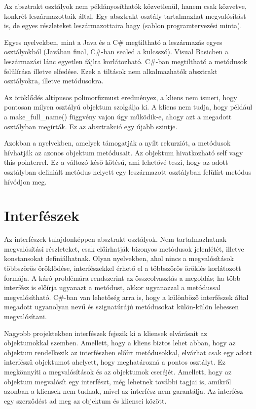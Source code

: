 \documentclass[a4paper,12pt,twoside]{report}
\theoremstyle{definition}
\begin{document}
	Az absztrakt osztályok nem példányosíthatók közvetlenül, hanem csak közvetve, konkrét leszármazottaik által. Egy absztrakt osztály tartalmazhat megvalósítást is, de egyes részleteket leszármazottaira hagy (sablon programtervezési minta).
	
	Egyes nyelvekben, mint a Java és a C\# megtiltható a leszármazás egyes osztályokból (Javában final, C\#-ban sealed a kulcsszó). Visual Basicben a leszármazási lánc egyetlen fájlra korlátozható. C\#-ban megtiltható a metódusok felülírása illetve elfedése. Ezek a tiltások nem alkalmazhatók absztrakt osztályokra, illetve metódusokra.
	
	Az öröklődés altípusos polimorfizmust eredményez, a kliens nem ismeri, hogy pontosan milyen osztályú objektum szolgálja ki. A kliens nem tudja, hogy például a make\_full\_name() függvény vajon úgy működik-e, ahogy azt a megadott osztályban megírták. Ez az absztrakció egy újabb szintje.
	
	Azokban a nyelvekben, amelyek támogatják a nyílt rekurziót, a metódusok hívhatják az azonos objektum metódusait. Az objektum hivatkozható self vagy this pointerrel. Ez a változó késő kötésű, ami lehetővé teszi, hogy az adott osztályban definiált metódus helyett egy leszármazott osztályban felülírt metódus hívódjon meg.
	
	\section{Interfészek}
	Az interfészek tulajdonképpen absztrakt osztályok. Nem tartalmazhatnak megvalósítási részleteket, csak előírhatják bizonyos metódusok jelenlétét, illetve konstansokat definiálhatnak. Olyan nyelvekben, ahol nincs a megvalósítások többszörös öröklődése, interfészekkel érhető el a többszörös öröklés korlátozott formája. A káró problémára rendszerint az összeolvasztás a megoldás; ha több interfész is előírja ugyanazt a metódust, akkor ugyanazzal a metódussal megvalósítható. C\#-ban van lehetőség arra is, hogy a különböző interfészek által megadott ugyanolyan nevű és szignatúrájú metódusokat külön-külön lehessen megvalósítani.
	
	Nagyobb projektekben interfészek fejezik ki a kliensek elvárásait az objektumokkal szemben. Amellett, hogy a kliens biztos lehet abban, hogy az objektum rendelkezik az interfészben előírt metódusokkal, elvárhat csak egy adott interfészű objektumot ahelyett, hogy meghatározná a pontos osztályt. Ez megkönnyíti a megvalósítások és az objektumok cseréjét. Amellett, hogy az objektum megvalósít egy interfészt, még lehetnek további tagjai is, amikről azonban a kliensek nem tudnak, mivel az interfész nem garantálja. Az interfész egy szerződést ad meg az objektum és kliensei között.
	
\end{document}

